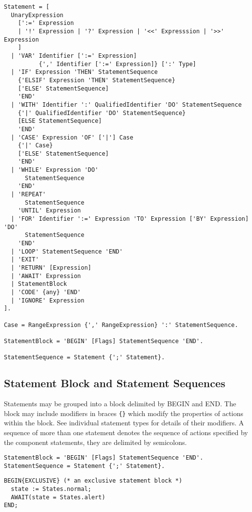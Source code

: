 \documentclass[a4wide,11pt]{article}
\begin{document}
\begin{lstlisting}[style=ebnf]
Statement = [
  UnaryExpression
    [':=' Expression
    | '!' Expression | '?' Expression | '<<' Expresssion | '>>' Expression
    ]
  | 'VAR' Identifier [':=' Expression] 
          {',' Identifier [':=' Expression]} [':' Type]
  | 'IF' Expression 'THEN' StatementSequence
    {'ELSIF' Expression 'THEN' StatementSequence}
    ['ELSE' StatementSequence]
    'END'
  | 'WITH' Identifier ':' QualifiedIdentifier 'DO' StatementSequence
    {'|' QualifiedIdentifier 'DO' StatementSequence}
    [ELSE StatementSequence]
    'END'
  | 'CASE' Expression 'OF' ['|'] Case
    {'|' Case}
    ['ELSE' StatementSequence]
    'END'
  | 'WHILE' Expression 'DO'
      StatementSequence
    'END'
  | 'REPEAT'
      StatementSequence
    'UNTIL' Expression
  | 'FOR' Identifier ':=' Expression 'TO' Expression ['BY' Expression] 'DO'
      StatementSequence
    'END'
  | 'LOOP' StatementSequence 'END'
  | 'EXIT'
  | 'RETURN' [Expression]
  | 'AWAIT' Expression
  | StatementBlock
  | 'CODE' {any} 'END'
  | 'IGNORE' Expression
].

Case = RangeExpression {',' RangeExpression} ':' StatementSequence.

StatementBlock = 'BEGIN' [Flags] StatementSequence 'END'.

StatementSequence = Statement {';' Statement}.
\end{lstlisting}

\subsection{Statement Block and Statement Sequences}
Statements may be grouped into a block delimited by BEGIN and END.
The block may include modifiers in braces \lstinline"{}"  which modify the properties of actions within the block.
See individual statement types for details of their modifiers.
A sequence of  more than one statement denotes the sequence of actions specified by the component statements, they are delimited by semicolons.

\begin{lstlisting}[style=ebnf]
StatementBlock = 'BEGIN' [Flags] StatementSequence 'END'.
StatementSequence = Statement {';' Statement}.
\end{lstlisting}

\begin{annotation}
\begin{lstlisting}[style=example]
BEGIN{EXCLUSIVE} (* an exclusive statement block *)
  state := States.normal;
  AWAIT(state = States.alert)
END;
\end{lstlisting}
\end{annotation}
\end{document}
